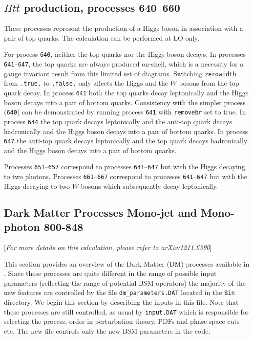 \documentclass{article}
\begin{document}
{{{{{{\subsection{$Ht{\bar t}$ production, processes 640--660}
\label{subsec:htt}

These processes represent the production of a Higgs boson in association
with a pair of top quarks. The calculation can be performed at LO only.

For process {\tt 640}, neither the top quarks nor the Higgs boson
decays. 
In processes {\tt 641-647}, the top quarks are always
produced on-shell, which is a necessity for a gauge invariant result
from this limited set of diagrams.
Switching {\tt zerowidth} from {\tt .true.} to {\tt .false.} only affects
the Higgs and the $W$ bosons from the top quark decay.
In process {\tt 641} both the top quarks decay leptonically
and the Higgs boson decays into a pair of bottom quarks. 
Consistency with
the simpler process ({\tt 640}) can be demonstrated by running process
{\tt 641} with {\tt removebr} set to true.
In process {\tt 644} the top quark decays leptonically
and the anti-top quark decays hadronically and the Higgs boson decays into a pair of bottom quarks. 
In process {\tt 647} the anti-top quark decays leptonically
and the top quark decays hadronically and the Higgs boson decays into a pair of bottom quarks. 

Processes {\tt 651}--{\tt 657} correspond to processes {\tt 641}--{\tt 647} but with the Higgs decaying
to two photons.
Processes {\tt 661}--{\tt 667} correspond to processes {\tt 641}--{\tt 647} but with the Higgs decaying
to two $W$-bosons which subsequently decay leptonically.

\subsection{Dark Matter Processes  Mono-jet and Mono-photon 800-848} 
[{\it For more details on this calculation, please refer to arXiv:1211.6390}]

This section provides an overview of the Dark Matter (DM) processes
available in \MCFM. Since these processes are quite different in the
range of possible input parameters (reflecting the range of potential
BSM operators) the majority of the new features are controlled by the
file {\tt dm\_parameters.DAT} located in the {\tt Bin} directory.  We
begin this section by describing the inputs in this file.  Note that
these processes are still controlled, as usual by {\tt input.DAT}
which is responsible for selecting the process, order in perturbation
theory, PDFs and phase space cuts etc. The new file controls only the
new BSM parameters in the code.

}}}}}}
\end{document}
